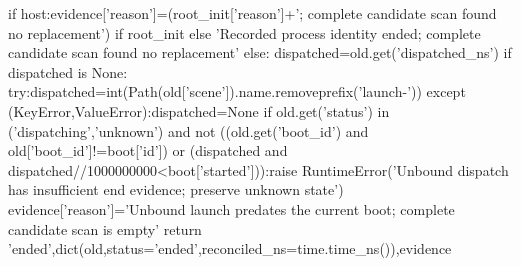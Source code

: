  if host:evidence['reason']=(root_init['reason']+'; complete candidate scan found no replacement') if root_init else 'Recorded process identity ended; complete candidate scan found no replacement'
 else:
  dispatched=old.get('dispatched_ns')
  if dispatched is None:
   try:dispatched=int(Path(old['scene']).name.removeprefix('launch-'))
   except (KeyError,ValueError):dispatched=None
  if old.get('status') in ('dispatching','unknown') and not ((old.get('boot_id') and old['boot_id']!=boot['id']) or (dispatched and dispatched//1000000000<boot['started'])):raise RuntimeError('Unbound dispatch has insufficient end evidence; preserve unknown state')
  evidence['reason']='Unbound launch predates the current boot; complete candidate scan is empty'
 return 'ended',dict(old,status='ended',reconciled_ns=time.time_ns()),evidence

